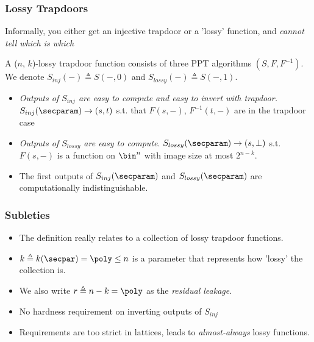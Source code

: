 \documentclass{beamer}
\begin{document}
\begin{frame}
    \frametitle{Lossy Trapdoors}
    Informally, you either get an injective trapdoor or a 'lossy' function, and \textit{cannot tell which is which}
    \begin{definition}
        A ($n$, $k$)-lossy trapdoor function consists of three PPT algorithms $(S, F, F^{-1})$.
        We denote $S_{inj}({-}) \triangleq S({-}, 0)$ and $S_{lossy}({-}) \triangleq S({-}, 1)$.
        \begin{itemize}
            \item \textit{Outputs of $S_{inj}$ are easy to compute and easy to invert with trapdoor.}
                  $S_{inj}(\secparam) \rightarrow (s, t)$ s.t. that $F(s, {-})$, $F^{-1}(t, {-})$ are in the trapdoor case
            \item \textit{Outputs of $S_{lossy}$ are easy to compute}.
                  $S_{lossy}(\secparam) \rightarrow (s, \bot)$ s.t. $F(s, {-})$ is a function on $\bin^n$
                  with image size at most $2^{n-k}$.
            \item The first outputs of $S_{inj}(\secparam)$ and $S_{lossy}(\secparam)$ are computationally indistinguishable.
        \end{itemize}
    \end{definition}
\end{frame}

\begin{frame}
    \frametitle{Subleties}
    \begin{itemize}
        \item The definition really relates to a collection of lossy trapdoor functions.
        \item $k \triangleq k(\secpar) = \poly \leq n$ is a parameter that represents how 'lossy' the collection is.
        \item We also write $r \triangleq n-k = \poly$ as the \textit{residual leakage}.
        \item No hardness requirement on inverting outputs of $S_{inj}$
        \item Requirements are too strict in lattices, leads to \textit{almost-always} lossy functions.
    \end{itemize}
\end{frame}
\end{document}
